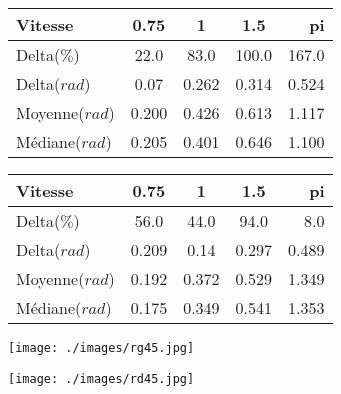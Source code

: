\documentclass[10pt,a4paper]{article}
\begin{document}
\begin{figure}[!]
    \begin{minipage}[c]{.46\linewidth}
        \centering
        \begin{tabular}{|l|c|c|c|r|}
 		\hline
  		Vitesse & 0.75 & 1 & 1.5 & pi \\
  		\hline
  		Delta($\%$) & 22.0 & 83.0 & 100.0 & 167.0 \\
  		\hline
  		Delta($rad$) & 0.07 & 0.262 & 0.314 & 0.524 \\
  		\hline
  		Moyenne($rad$) & 0.200 & 0.426 & 0.613 & 1.117 \\
  		\hline
  		Médiane($rad$) & 0.205 & 0.401 & 0.646 & 1.100 \\
  		\hline
		\end{tabular}
    \end{minipage}
    \hfill%
    \begin{minipage}[c]{.46\linewidth}
        \centering
        \begin{tabular}{|l|c|c|c|r|}
 		\hline
  		Vitesse & 0.75 & 1 & 1.5 & pi \\
  		\hline
  		Delta($\%$) & 56.0 & 44.0 & 94.0 & 8.0 \\
  		\hline
  		Delta($rad$) & 0.209 & 0.14 & 0.297 & 0.489 \\
  		\hline
  		Moyenne($rad$) & 0.192 & 0.372 & 0.529 & 1.349 \\
  		\hline
  		Médiane($rad$) & 0.175 & 0.349 & 0.541 & 1.353 \\
  		\hline
		\end{tabular}
    \end{minipage}
\end{figure}

\begin{figure}[!]
\begin{minipage}{0.46\linewidth}
    	\centering
        \texttt{[image: ./images/rg45.jpg]}
    \end{minipage}\hfill
    \begin{minipage}[c]{.46\linewidth}
        \centering
        \texttt{[image: ./images/rd45.jpg]}
    \end{minipage}
\end{figure}
   
\end{document}

